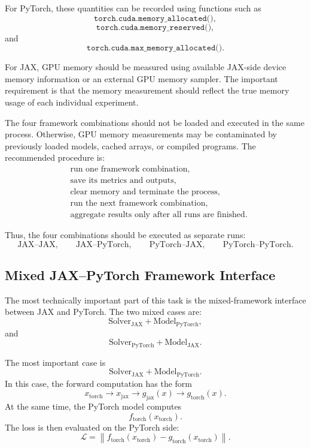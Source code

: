 \documentclass{article}
\begin{document}
For PyTorch, these quantities can be recorded using functions such as
\[
\texttt{torch.cuda.memory\_allocated()},
\]
\[
\texttt{torch.cuda.memory\_reserved()},
\]
and
\[
\texttt{torch.cuda.max\_memory\_allocated()}.
\]

For JAX, GPU memory should be measured using available JAX-side device memory information or an external GPU memory sampler. The important requirement is that the memory measurement should reflect the true memory usage of each individual experiment.

The four framework combinations should not be loaded and executed in the same process. Otherwise, GPU memory measurements may be contaminated by previously loaded models, cached arrays, or compiled programs. The recommended procedure is:
\[
\begin{aligned}
&\text{run one framework combination},\\
&\text{save its metrics and outputs},\\
&\text{clear memory and terminate the process},\\
&\text{run the next framework combination},\\
&\text{aggregate results only after all runs are finished}.
\end{aligned}
\]

Thus, the four combinations should be executed as separate runs:
\[
\text{JAX--JAX},
\qquad
\text{JAX--PyTorch},
\qquad
\text{PyTorch--JAX},
\qquad
\text{PyTorch--PyTorch}.
\]

\subsection{Mixed JAX--PyTorch Framework Interface}

The most technically important part of this task is the mixed-framework interface between JAX and PyTorch. The two mixed cases are:
\[
\text{Solver}_{\mathrm{JAX}} + \text{Model}_{\mathrm{PyTorch}},
\]
and
\[
\text{Solver}_{\mathrm{PyTorch}} + \text{Model}_{\mathrm{JAX}}.
\]

The most important case is
\[
\text{Solver}_{\mathrm{JAX}} + \text{Model}_{\mathrm{PyTorch}}.
\]
In this case, the forward computation has the form
\[
x_{\mathrm{torch}}
\rightarrow
x_{\mathrm{jax}}
\rightarrow
g_{\mathrm{jax}}(x)
\rightarrow
g_{\mathrm{torch}}(x).
\]
At the same time, the PyTorch model computes
\[
f_{\mathrm{torch}}(x_{\mathrm{torch}}).
\]
The loss is then evaluated on the PyTorch side:
\[
\mathcal{L}
=
\left\|
f_{\mathrm{torch}}(x_{\mathrm{torch}})
-
g_{\mathrm{torch}}(x_{\mathrm{torch}})
\right\|.
\]
\end{document}
